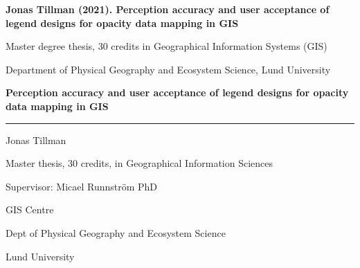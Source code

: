 
   
% 


\setcounter{page}{2}


\textbf{Jonas Tillman (2021). Perception accuracy and user acceptance of legend designs for opacity data mapping in GIS}

Master degree thesis, 30 credits in Geographical Information Systems (GIS) 

Department of Physical Geography and Ecosystem Science, Lund University

\newpage



\begin{center}
    \vspace*{1cm}
        
    \Huge
    \textbf{Perception accuracy and user acceptance of legend designs for opacity data mapping in GIS}
    
    \vspace{5cm}
        
    \rule{15cm}{1.0pt}

    \Large
    Jonas Tillman

    Master thesis, 30 credits, in Geographical Information Sciences
    
    \vspace{2cm}
    
    Supervisor: Micael Runnström PhD

    GIS Centre
    
    Dept of Physical Geography and Ecosystem Science
    
    Lund University
                    
\end{center}

\newpage

